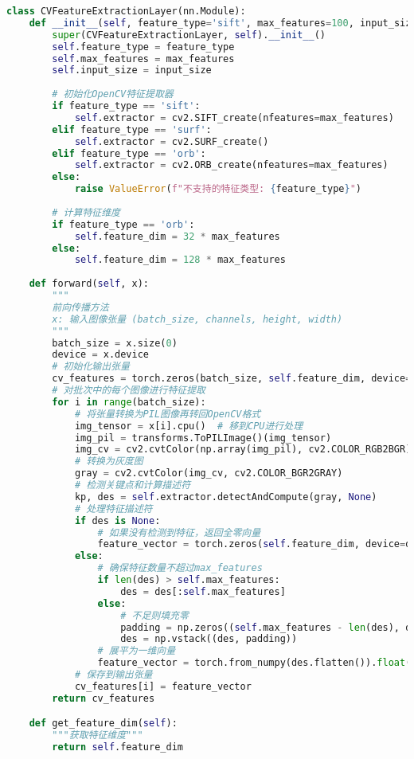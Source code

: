 \documentclass{article}
\begin{document}
\begin{lstlisting}[language=Python]
class CVFeatureExtractionLayer(nn.Module):
    def __init__(self, feature_type='sift', max_features=100, input_size=(3, 224, 224)):
        super(CVFeatureExtractionLayer, self).__init__()
        self.feature_type = feature_type
        self.max_features = max_features
        self.input_size = input_size
        
        # 初始化OpenCV特征提取器
        if feature_type == 'sift':
            self.extractor = cv2.SIFT_create(nfeatures=max_features)
        elif feature_type == 'surf':
            self.extractor = cv2.SURF_create()
        elif feature_type == 'orb':
            self.extractor = cv2.ORB_create(nfeatures=max_features)
        else:
            raise ValueError(f"不支持的特征类型: {feature_type}")
        
        # 计算特征维度
        if feature_type == 'orb':
            self.feature_dim = 32 * max_features
        else:
            self.feature_dim = 128 * max_features
    
    def forward(self, x):
        """
        前向传播方法
        x: 输入图像张量 (batch_size, channels, height, width)
        """
        batch_size = x.size(0)
        device = x.device
        # 初始化输出张量
        cv_features = torch.zeros(batch_size, self.feature_dim, device=device)
        # 对批次中的每个图像进行特征提取
        for i in range(batch_size):
            # 将张量转换为PIL图像再转回OpenCV格式
            img_tensor = x[i].cpu()  # 移到CPU进行处理
            img_pil = transforms.ToPILImage()(img_tensor)
            img_cv = cv2.cvtColor(np.array(img_pil), cv2.COLOR_RGB2BGR)
            # 转换为灰度图
            gray = cv2.cvtColor(img_cv, cv2.COLOR_BGR2GRAY)
            # 检测关键点和计算描述符
            kp, des = self.extractor.detectAndCompute(gray, None)
            # 处理特征描述符
            if des is None:
                # 如果没有检测到特征，返回全零向量
                feature_vector = torch.zeros(self.feature_dim, device=device)
            else:
                # 确保特征数量不超过max_features
                if len(des) > self.max_features:
                    des = des[:self.max_features]
                else:
                    # 不足则填充零
                    padding = np.zeros((self.max_features - len(des), des.shape[1]), dtype=des.dtype)
                    des = np.vstack((des, padding))
                # 展平为一维向量
                feature_vector = torch.from_numpy(des.flatten()).float().to(device)
            # 保存到输出张量
            cv_features[i] = feature_vector
        return cv_features

    def get_feature_dim(self):
        """获取特征维度"""
        return self.feature_dim
\end{lstlisting}
\end{document}
